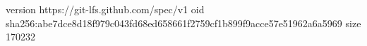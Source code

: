 version https://git-lfs.github.com/spec/v1
oid sha256:abe7dce8d18f979c043fd68ed658661f2759cf1b899f9acce57e51962a6a5969
size 170232

